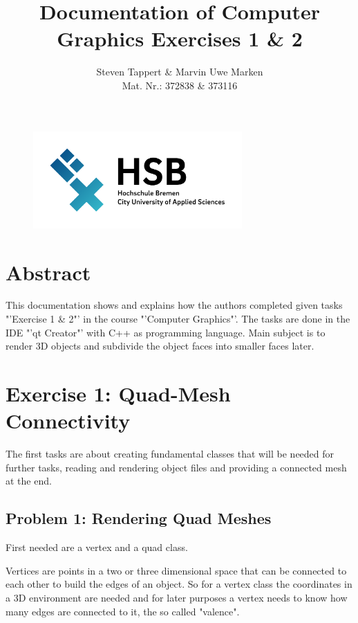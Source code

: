 \documentclass[11.5pt,oneside,a4paper]{scrartcl}
\title{Documentation of Computer Graphics Exercises 1 \& 2}
\author{Steven Tappert \& Marvin Uwe Marken\\\small{Mat. Nr.: 372838 \& 373116}}
\date{}
\newcounter{ct}
\begin{document}
\clearpage
{\let\newpage\relax\maketitle}
\thispagestyle{empty}
\vspace{20pt}

\begin{figure}
	\centering
	\includegraphics[width=8cm]{hsb.png} \\
\end{figure}

\newpage
\tableofcontents
\newpage

\section{Abstract}
This documentation shows and explains how the authors completed given tasks "'Exercise 1 \& 2"' in the course "'Computer Graphics"'. The tasks are done in the IDE "'qt Creator"' with C++ as programming language. Main subject is to render 3D objects and subdivide the object faces into smaller faces later.

\section{Exercise 1: Quad-Mesh Connectivity}

The first tasks are about creating fundamental classes that will be needed for further tasks, reading and rendering object files and providing a connected mesh at the end.


\subsection{Problem 1: Rendering Quad Meshes}

First needed are a vertex and a quad class.

Vertices are points in a two or three dimensional space that can be connected to each other to build the edges of an object. So for a vertex class the coordinates in a 3D environment are needed and for later purposes a vertex needs to know how many edges are connected to it, the so called "valence".
\end{document}
